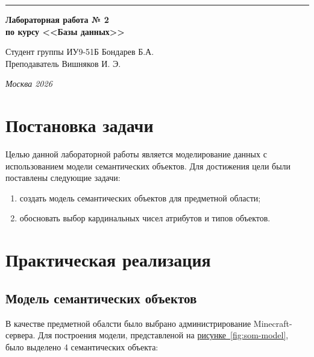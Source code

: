 \documentclass[a4paper, 14pt]{extarticle}
\begin{document}
\begin{titlepage}
\vspace*{-16pt}
\hspace{30pt}\rule{0.866\textwidth}{0.4pt}
  
\vspace{11em}

\begin{center}
\Large {\bf Лабораторная работа № 2 } \\ 
\large {\bf по курсу <<Базы данных>>} \\ 
\end{center}\normalsize

\vspace{8em}


\begin{flushright}
  {Студент группы ИУ9-51Б Бондарев Б.А.\hspace*{15pt} \\
  \vspace{2ex}
  Преподаватель Вишняков И. Э.\hspace*{15pt}}
\end{flushright}

\bigskip

\vfill
 

\begin{center}
\textsl{Москва 2026}
\end{center}
\end{titlepage}

\section{Постановка задачи}
Целью данной лабораторной работы является моделирование данных с
использованием модели семантических объектов.
Для достижения цели были поставлены следующие задачи:
\begin{enumerate}
    \item создать модель семантических объектов для предметной области; 
    \item обосновать выбор кардинальных чисел атрибутов и типов объектов.
\end{enumerate}

\section{Практическая реализация}

\subsection{Модель семантических объектов}
В качестве предметной обалсти было выбрано администрирование Minecraft-сервера. Для построения модели, 
представленой на \hyperref[fig:som-model]{рисунке~\ref*{fig:som-model}}, было выделено 4 семантических объекта:
\end{document}
